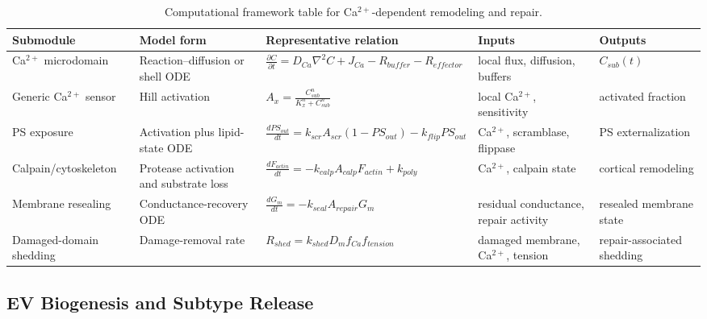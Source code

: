 \begin{table}[t]
\footnotesize\sf
\centering
\caption{Computational framework table for Ca$^{2+}$-dependent remodeling and repair.\label{T_A8_comp_remodel_repair}}
\begin{tabular}{p{2.6cm} p{3.0cm} p{4.6cm} p{2.8cm} p{2.8cm}}
\toprule
\textbf{Submodule} & \textbf{Model form} & \textbf{Representative relation} & \textbf{Inputs} & \textbf{Outputs} \\
\midrule
Ca$^{2+}$ microdomain & Reaction--diffusion or shell ODE \cite{naraghi1997linearized,shannon2004mathematical} & $\frac{\partial C}{\partial t}=D_{Ca}\nabla^2C+J_{Ca}-R_{buffer}-R_{effector}$ & local flux, diffusion, buffers & $C_{sub}(t)$ \\
Generic Ca$^{2+}$ sensor & Hill activation \cite{naraghi1997linearized,shannon2004mathematical,scheffer2014mechanism} & $A_x=\frac{C_{sub}^n}{K_x^n+C_{sub}^n}$ & local Ca$^{2+}$, sensitivity & activated fraction \\
PS exposure & Activation plus lipid-state ODE \cite{vernier2006nanoporeJACS,vernier2006nanoporePhysBio,muratori2017activation} & $\frac{dPS_{out}}{dt}=k_{scr}A_{scr}(1-PS_{out})-k_{flip}PS_{out}$ & Ca$^{2+}$, scramblase, flippase & PS externalization \\
Calpain/cytoskeleton & Protease activation and substrate loss \cite{campbell2012structure,roberts2020ca,williams2025calpains} & $\frac{dF_{actin}}{dt}=-k_{calp}A_{calp}F_{actin}+k_{poly}$ & Ca$^{2+}$, calpain state & cortical remodeling \\
Membrane resealing & Conductance-recovery ODE \cite{tarek2005membrane,needham1989electro} & $\frac{dG_m}{dt}=-k_{seal}A_{repair}G_m$ & residual conductance, repair activity & resealed membrane state \\
Damaged-domain shedding & Damage-removal rate \cite{needham1989electro} & $R_{shed}=k_{shed}D_m f_{Ca}f_{tension}$ & damaged membrane, Ca$^{2+}$, tension & repair-associated shedding \\
\bottomrule
\end{tabular}
\end{table}

\subsection*{EV Biogenesis and Subtype Release}

